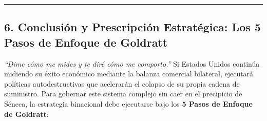 \documentclass[12pt,letterpaper]{article}
\begin{document}
\begin{center}\rule{0.5\linewidth}{0.5pt}\end{center}

\hypertarget{conclusiuxf3n-y-prescripciuxf3n-estratuxe9gica-los-5-pasos-de-enfoque-de-goldratt}{%
\subsection{6. Conclusión y Prescripción Estratégica: Los 5 Pasos de
Enfoque de
Goldratt}\label{conclusiuxf3n-y-prescripciuxf3n-estratuxe9gica-los-5-pasos-de-enfoque-de-goldratt}}

\emph{``Dime cómo me mides y te diré cómo me comporto.''} Si Estados
Unidos continúa midiendo su éxito económico mediante la balanza
comercial bilateral, ejecutará políticas autodestructivas que acelerarán
el colapso de su propia cadena de suministro. Para gobernar este sistema
complejo sin caer en el precipicio de Séneca, la estrategia binacional
debe ejecutarse bajo los \textbf{5 Pasos de Enfoque de Goldratt}:
\end{document}
